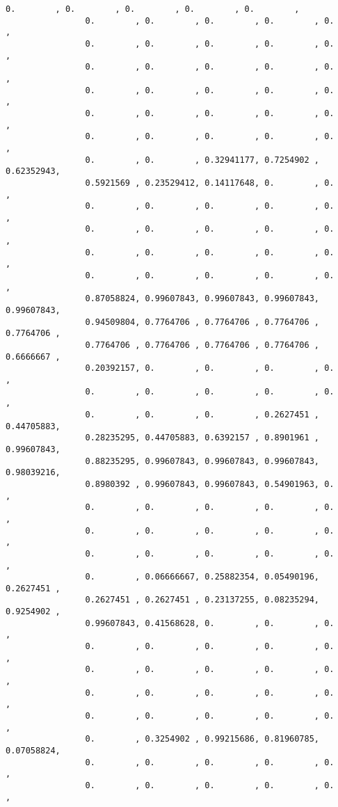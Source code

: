 \documentclass[11pt]{article}
\begin{document}
\begin{Verbatim}[commandchars=\\\{\}]
                0.        , 0.        , 0.        , 0.        , 0.        ,
                0.        , 0.        , 0.        , 0.        , 0.        ,
                0.        , 0.        , 0.        , 0.        , 0.        ,
                0.        , 0.        , 0.        , 0.        , 0.        ,
                0.        , 0.        , 0.        , 0.        , 0.        ,
                0.        , 0.        , 0.        , 0.        , 0.        ,
                0.        , 0.        , 0.        , 0.        , 0.        ,
                0.        , 0.        , 0.32941177, 0.7254902 , 0.62352943,
                0.5921569 , 0.23529412, 0.14117648, 0.        , 0.        ,
                0.        , 0.        , 0.        , 0.        , 0.        ,
                0.        , 0.        , 0.        , 0.        , 0.        ,
                0.        , 0.        , 0.        , 0.        , 0.        ,
                0.        , 0.        , 0.        , 0.        , 0.        ,
                0.87058824, 0.99607843, 0.99607843, 0.99607843, 0.99607843,
                0.94509804, 0.7764706 , 0.7764706 , 0.7764706 , 0.7764706 ,
                0.7764706 , 0.7764706 , 0.7764706 , 0.7764706 , 0.6666667 ,
                0.20392157, 0.        , 0.        , 0.        , 0.        ,
                0.        , 0.        , 0.        , 0.        , 0.        ,
                0.        , 0.        , 0.        , 0.2627451 , 0.44705883,
                0.28235295, 0.44705883, 0.6392157 , 0.8901961 , 0.99607843,
                0.88235295, 0.99607843, 0.99607843, 0.99607843, 0.98039216,
                0.8980392 , 0.99607843, 0.99607843, 0.54901963, 0.        ,
                0.        , 0.        , 0.        , 0.        , 0.        ,
                0.        , 0.        , 0.        , 0.        , 0.        ,
                0.        , 0.        , 0.        , 0.        , 0.        ,
                0.        , 0.06666667, 0.25882354, 0.05490196, 0.2627451 ,
                0.2627451 , 0.2627451 , 0.23137255, 0.08235294, 0.9254902 ,
                0.99607843, 0.41568628, 0.        , 0.        , 0.        ,
                0.        , 0.        , 0.        , 0.        , 0.        ,
                0.        , 0.        , 0.        , 0.        , 0.        ,
                0.        , 0.        , 0.        , 0.        , 0.        ,
                0.        , 0.        , 0.        , 0.        , 0.        ,
                0.        , 0.3254902 , 0.99215686, 0.81960785, 0.07058824,
                0.        , 0.        , 0.        , 0.        , 0.        ,
                0.        , 0.        , 0.        , 0.        , 0.        ,

\end{Verbatim}
\end{document}

